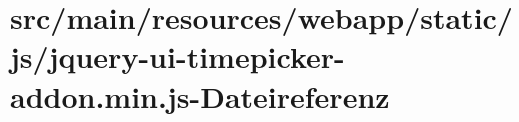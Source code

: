 \hypertarget{jquery-ui-timepicker-addon_8min_8js}{\section{src/main/resources/webapp/static/js/jquery-\/ui-\/timepicker-\/addon.min.\-js-\/\-Dateireferenz}
\label{jquery-ui-timepicker-addon_8min_8js}
}
